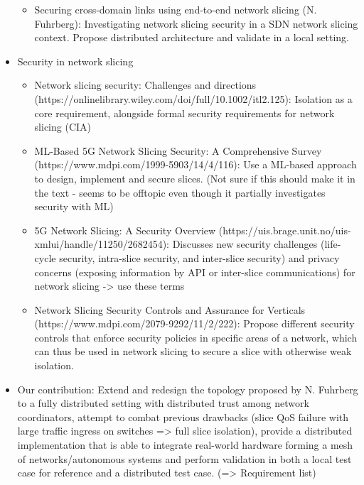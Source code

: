 \documentclass{article}
\begin{document}
\begin{itemize}
\begin{itemize}
        \item Securing cross-domain links using end-to-end network slicing (N. Fuhrberg): Investigating network slicing security in a SDN network slicing context. Propose distributed architecture and validate in a local setting.
    \end{itemize}
    \item Security in network slicing
    \begin{itemize}
        \item Network slicing security: Challenges and directions (https://onlinelibrary.wiley.com/doi/full/10.1002/itl2.125): Isolation as a core requirement, alongside formal security requirements for network slicing (CIA)
        \item ML-Based 5G Network Slicing Security: A Comprehensive Survey (https://www.mdpi.com/1999-5903/14/4/116): Use a ML-based approach to design, implement and secure slices. (Not sure if this should make it in the text - seems to be offtopic even though it partially investigates security with ML)
        \item 5G Network Slicing: A Security Overview (https://uis.brage.unit.no/uis-xmlui/handle/11250/2682454): Discusses new security challenges (life-cycle security, intra-slice security, and inter-slice security) and privacy concerns (exposing information by API or inter-slice communications) for network slicing -> use these terms
        \item Network Slicing Security Controls and Assurance for Verticals (https://www.mdpi.com/2079-9292/11/2/222): Propose different security controls that enforce security policies in specific areas of a network, which can thus be used in network slicing to secure a slice with otherwise weak isolation.
    \end{itemize}
    \item Our contribution: Extend and redesign the topology proposed by N. Fuhrberg to a fully distributed setting with distributed trust among network coordinators, attempt to combat previous drawbacks (slice QoS failure with large traffic ingress on switches => full slice isolation), provide a distributed implementation that is able to integrate real-world hardware forming a mesh of networks/autonomous systems and perform validation in both a local test case for reference and a distributed test case. (=> Requirement list)
\end{itemize}
\fi
\end{document}
